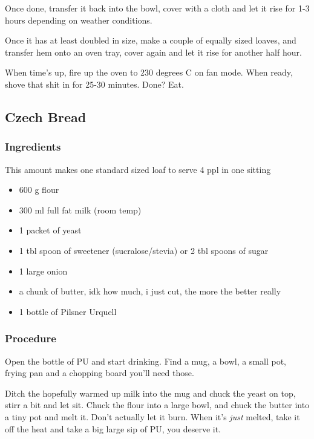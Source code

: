 \documentclass[10pt]{article}
\begin{document}
Once done, transfer it back into the bowl, cover with a cloth and let it rise for 1-3 hours depending on weather conditions.\par

Once it has at least doubled in size, make a couple of equally sized loaves, and transfer hem onto an oven tray, cover again and let it rise for another half hour.\par

When time's up, fire up the oven to 230 degrees C on fan mode. When ready, shove that shit in for 25-30 minutes. Done? Eat.
\subsection{Czech Bread}%
\label{sub:czech_bread}

\subsubsection{Ingredients}%
\label{ssub:czech_bread_ingredients}
This amount makes one standard sized loaf to serve 4 ppl in one sitting

\begin{itemize}
	\item 600 g flour
	\item 300 ml full fat milk (room temp)
	\item 1 packet of yeast
	\item 1 tbl spoon of sweetener (sucralose/stevia) or 2 tbl spoons of sugar
	\item 1 large onion
	\item a chunk of butter, idk how much, i just cut, the more the better really
	\item 1 bottle of Pilsner Urquell
\end{itemize}
\subsubsection{Procedure}%
\label{ssub:czech_bread_procedure}

Open the bottle of PU and start drinking. Find a mug, a bowl, a small pot, frying pan and a chopping board you'll need those.\par

Ditch the hopefully warmed up milk into the mug and chuck the yeast on top, stirr a bit and let sit. Chuck the flour into a large bowl, and chuck the butter into a tiny pot and melt it. Don't actually let it burn. When it's \textit{just} melted, take it off the heat and take a big large sip of PU, you deserve it.\par
\end{document}
